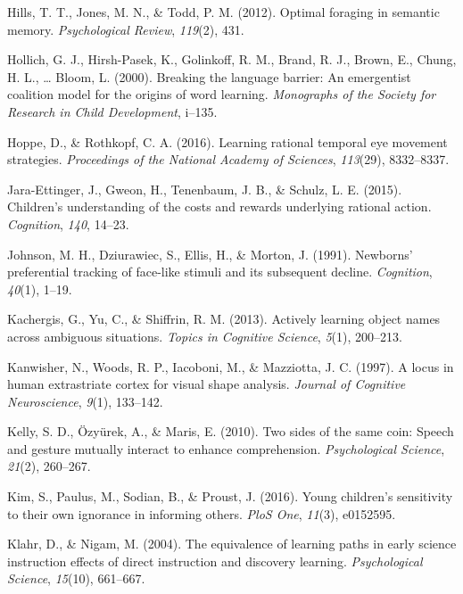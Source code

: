 \documentclass[oneside]{report}
\begin{document}
\hypertarget{ref-hills2012optimal}{}
Hills, T. T., Jones, M. N., \& Todd, P. M. (2012). Optimal foraging in
semantic memory. \emph{Psychological Review}, \emph{119}(2), 431.

\hypertarget{ref-hollich2000breaking}{}
Hollich, G. J., Hirsh-Pasek, K., Golinkoff, R. M., Brand, R. J., Brown,
E., Chung, H. L., \ldots{} Bloom, L. (2000). Breaking the language
barrier: An emergentist coalition model for the origins of word
learning. \emph{Monographs of the Society for Research in Child
Development}, i--135.

\hypertarget{ref-hoppe2016learning}{}
Hoppe, D., \& Rothkopf, C. A. (2016). Learning rational temporal eye
movement strategies. \emph{Proceedings of the National Academy of
Sciences}, \emph{113}(29), 8332--8337.

\hypertarget{ref-jara2015children}{}
Jara-Ettinger, J., Gweon, H., Tenenbaum, J. B., \& Schulz, L. E. (2015).
Children's understanding of the costs and rewards underlying rational
action. \emph{Cognition}, \emph{140}, 14--23.

\hypertarget{ref-johnson1991newborns}{}
Johnson, M. H., Dziurawiec, S., Ellis, H., \& Morton, J. (1991).
Newborns' preferential tracking of face-like stimuli and its subsequent
decline. \emph{Cognition}, \emph{40}(1), 1--19.

\hypertarget{ref-kachergis2013actively}{}
Kachergis, G., Yu, C., \& Shiffrin, R. M. (2013). Actively learning
object names across ambiguous situations. \emph{Topics in Cognitive
Science}, \emph{5}(1), 200--213.

\hypertarget{ref-kanwisher1997locus}{}
Kanwisher, N., Woods, R. P., Iacoboni, M., \& Mazziotta, J. C. (1997). A
locus in human extrastriate cortex for visual shape analysis.
\emph{Journal of Cognitive Neuroscience}, \emph{9}(1), 133--142.

\hypertarget{ref-kelly2010two}{}
Kelly, S. D., Özyürek, A., \& Maris, E. (2010). Two sides of the same
coin: Speech and gesture mutually interact to enhance comprehension.
\emph{Psychological Science}, \emph{21}(2), 260--267.

\hypertarget{ref-kim2016young}{}
Kim, S., Paulus, M., Sodian, B., \& Proust, J. (2016). Young children's
sensitivity to their own ignorance in informing others. \emph{PloS One},
\emph{11}(3), e0152595.

\hypertarget{ref-klahr2004equivalence}{}
Klahr, D., \& Nigam, M. (2004). The equivalence of learning paths in
early science instruction effects of direct instruction and discovery
learning. \emph{Psychological Science}, \emph{15}(10), 661--667.
\end{document}

